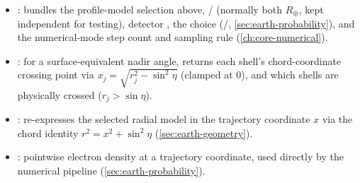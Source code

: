 \begin{implbox}
\begin{itemize}
  \item {}: bundles the profile-model selection
    above, / (normally both
    $R_\oplus$, kept independent for testing), detector , the
     choice (/,
    \cref{sec:earth-probability}), and the numerical-mode step count
     and sampling rule 
    (\cref{ch:core-numerical}).
  \item {}: for a surface-equivalent
    nadir angle, returns each shell's chord-coordinate crossing point via
    $x_j=\sqrt{r_j^2-\sin^2\eta}$ (clamped at 0), and which shells are
    physically crossed ($r_j>\sin\eta$).
  \item {}: re-expresses the
    selected radial model in the trajectory coordinate $x$ via the chord
    identity $r^2=x^2+\sin^2\eta$ (\cref{sec:earth-geometry}).
  \item {}: pointwise electron
    density at a trajectory coordinate, used directly by the numerical
    pipeline (\cref{sec:earth-probability}).
\end{itemize}
\end{implbox}

